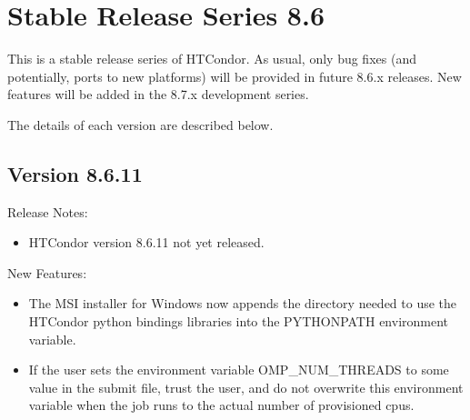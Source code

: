 
\section{\label{sec:History-8-6}Stable Release Series 8.6}

This is a stable release series of HTCondor.
As usual, only bug fixes (and potentially, ports to new platforms)
will be provided in future 8.6.x releases.
New features will be added in the 8.7.x development series.

The details of each version are described below.

\subsection*{\label{sec:New-8-6-11}Version 8.6.11}

\noindent Release Notes:

\begin{itemize}

\item HTCondor version 8.6.11 not yet released.

\end{itemize}


\noindent New Features:

\begin{itemize}

\item The MSI installer for Windows now appends the directory needed to use the
HTCondor python bindings libraries into the PYTHONPATH environment variable.

\item If the user sets the environment variable OMP\_NUM\_THREADS to some value
in the submit file, trust the user, and do not overwrite this environment
variable when the job runs to the actual number of provisioned cpus.

\end{itemize}

